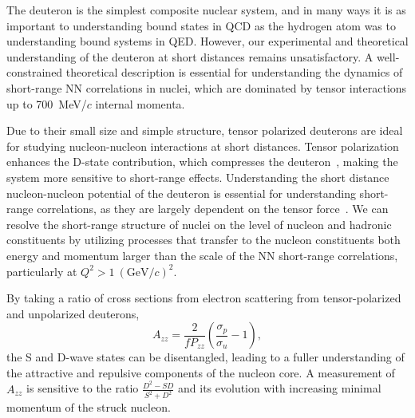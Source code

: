 
The deuteron is the simplest composite nuclear system, and in many ways it is as important to understanding bound states in QCD as the hydrogen atom was to understanding bound systems in QED.  However, our experimental and theoretical understanding of the deuteron at short distances remains unsatisfactory. A well-constrained theoretical description is essential for understanding the dynamics of short-range NN correlations in nuclei, which are dominated by tensor interactions up to 700~MeV/$c$ internal momenta.


Due to their small size and simple structure, tensor polarized deuterons are ideal for studying nucleon-nucleon interactions at short distances. Tensor polarization enhances the D-state contribution, which compresses the deuteron~\cite{Forest:1996kp}, 
making the system more sensitive to short-range effects. Understanding the short distance nucleon-nucleon potential of the deuteron is essential for understanding short-range correlations, as they are largely dependent on the tensor force~\cite{Arrington:2011xs}. We can resolve the short-range structure of nuclei on the level of nucleon and hadronic constituents by utilizing processes that transfer to the nucleon constituents both energy and momentum larger than the scale of the NN short-range correlations, particularly at $Q^2>1~(\mathrm{GeV}/c)^2$.





By taking a ratio of cross sections from electron scattering from tensor-polarized and unpolarized deuterons, 
\begin{equation}
A_{zz}=\frac{2}{fP_{zz}}\left(\frac{\sigma_p}{\sigma_u}-1\right),
\end{equation}
the S and D-wave states can be disentangled, leading to a fuller understanding of the attractive and repulsive components of the nucleon core. A measurement of $A_{zz}$ is sensitive to the ratio $\frac{D^2-SD}{S^2+D^2}$ and its evolution with increasing minimal momentum of the struck nucleon. 

